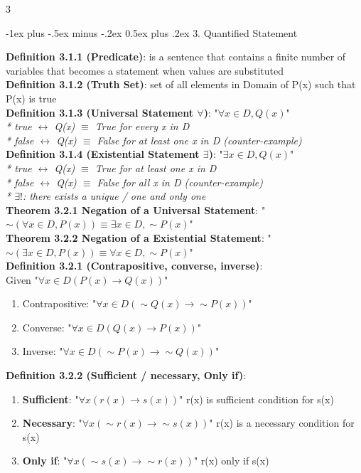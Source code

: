 \documentclass[10pt,landscape]{article}
\makeatletter
\renewcommand{\section}{\@startsection{section}{1}{0mm}%
    {-1ex plus -.5ex minus -.2ex}%
    {0.5ex plus .2ex}%
    {\normalfont\large\bfseries}}
\makeatother
\begin{document}
\begin{multicols}{3}
\begin{mdframed}
        \section{3. Quantified Statement}
    \end{mdframed}
    \textbf{Definition 3.1.1 (Predicate)}: is a sentence that contains a finite number of variables that becomes a statement when values are substituted \\
    \textbf{Definition 3.1.2 (Truth Set)}: set of all elements in Domain of P(x) such that P(x) is true \\
    \textbf{Definition 3.1.3 (Universal Statement $\forall$)}: "$\forall x \in D, Q(x)$" \\
    \textit{* true $\leftrightarrow$ Q(x) $\equiv$ True for every x in D} \\
    \textit{* false $\leftrightarrow$ Q(x) $\equiv$ False for at least one x in D (counter-example)} \\
    \textbf{Definition 3.1.4 (Existential Statement $\exists$)}: "$\exists x \in D, Q(x)$" \\
    \textit{* true $\leftrightarrow$ Q(x) $\equiv$ True for at least one x in D} \\
    \textit{* false $\leftrightarrow$ Q(x) $\equiv$ False for all x in D (counter-example)} \\
    \textit{* $\exists!$: there exists a unique / one and only one} \\
    \textbf{Theorem 3.2.1 Negation of a Universal Statement}: "$\sim (\forall x \in D, P(x)) \equiv \exists x \in D, \sim P(x)$" \\
    \textbf{Theorem 3.2.2 Negation of a Existential Statement}: "$\sim (\exists x \in D, P(x)) \equiv \forall x \in D, \sim P(x) $" \\
    \textbf{Definition 3.2.1 (Contrapositive, converse, inverse)}: \\
    Given "$\forall x \in D (P(x) \rightarrow Q(x))$"
    \begin{enumerate}
        \item Contrapositive: "$\forall x \in D (\sim Q(x) \rightarrow \sim P(x))$"
        \item Converse: "$\forall x \in D (Q(x) \rightarrow P(x))$"
        \item Inverse: "$\forall x \in D (\sim P(x) \rightarrow \sim Q(x))$"
    \end{enumerate}
    \textbf{Definition 3.2.2 (Sufficient / necessary, Only if)}: \\
    \begin{enumerate}
        \item \textbf{Sufficient}: "$\forall x (r(x) \rightarrow s(x))$" r(x) is sufficient condition for s(x)
        \item \textbf{Necessary}: "$\forall x (\sim r(x) \rightarrow \sim s(x))$" r(x) is a necessary condition for s(x)
        \item \textbf{Only if}: "$\forall x (\sim s(x) \rightarrow \sim r(x))$" r(x) only if s(x)
    \end{enumerate}

\end{multicols}
\end{document}
